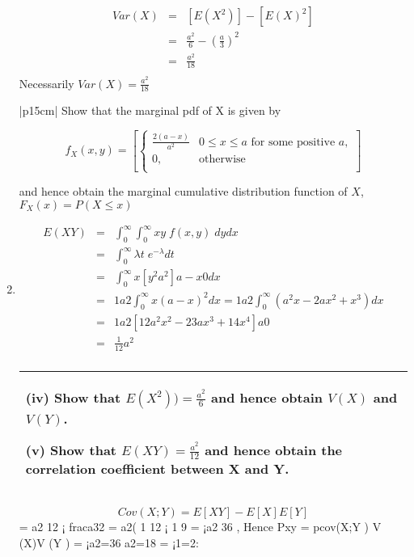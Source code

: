 \documentclass[a4paper,12pt]{article}
\begin{document}
\begin{enumerate}
\begin{eqnarray*}
Var(X) &=& [E(X^2)] - [E(X)^2] \\
      &=& \frac{a^2}{6} - \left(\frac{a}{3}\right)^2 \\
     &=& \frac{a^2}{18} \\
\end{eqnarray*}
Necessarily $Var(X) = \frac{a^2}{18}$


\newpage
  \begin{table}[ht!]
     \centering
     \begin{tabular}{|p{15cm}|}
     \hline
  Show that the marginal pdf of X is given by 



\[  f_X(x,y) = \left[ \begin{cases}  
\frac{2(a-x)}{a^2} &  0 \leq x  \leq a \mbox{ for some positive } a,    \\
0,  & \mbox{otherwise} \\ 
\end{cases}  \right] \]
  
 and hence obtain the marginal cumulative distribution function of $X$, $F_X(x) = P(X \leq x)$\\
\hline

      \end{tabular}
    \end{table}

\item 

\begin{eqnarray*}
E(XY) &=& \int^{\infty}_{0} \int^{\infty}_{0} xy\; f(x,y) \; dydx \\
    &=&\int^{\infty}_{0} \lambda t\;e^{-\lambda} dt \\
&=&
\int^{\infty}_{0} x[ y^2
a^2 ]a-x
0 dx \\ &=& 1
a2
\int^{\infty}_{0} x(a - x)^2dx = 1
a2
\int^{\infty}_{0}(a^2x - 2ax^2 + x^3)dx\\
&=& 1
a2 [ 1
2a^2x^2 - 2
3ax^3 + 1
4x^4]a
0\\ &=& \frac{1}{12}a^2\\
\end{eqnarray*}

\newpage

  \begin{table}[ht!]
     \centering
     \begin{tabular}{|p{15cm}|}
     \hline  
 (iv) Show that $E(X^2)) = \frac{a^2}{6}$
and hence obtain $V(X)$ and $V(Y)$.       
 
(v) Show that $E(XY) = \frac{a^2}{12}$
and hence obtain the correlation coefficient 
between X and Y.\\ \hline
\end{tabular}
\end{table}
\[Cov(X; Y ) = E[XY ] - E[X]E[Y ]\] = a2
12 ¡ fraca32 = a2( 1
12 ¡ 1
9 = ¡a2
36 ,
Hence Pxy = pcov(X;Y )
V (X)V (Y )
= ¡a2=36
a2=18 = ¡1=2:
\end{enumerate}
\end{document}
